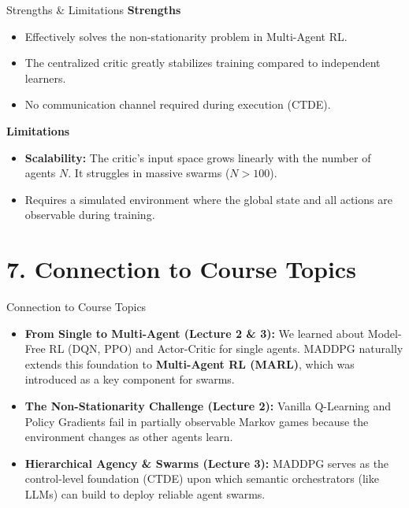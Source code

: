 \documentclass[aspectratio=169]{beamer}
\begin{document}
\begin{frame}{Strengths \& Limitations}
    \textbf{Strengths}
    \begin{itemize}
        \item Effectively solves the non-stationarity problem in Multi-Agent RL.
        \item The centralized critic greatly stabilizes training compared to independent learners.
        \item No communication channel required during execution (CTDE).
    \end{itemize}
    \vspace{0.5cm}
    \textbf{Limitations}
    \begin{itemize}
        \item \textbf{Scalability:} The critic's input space grows linearly with the number of agents $N$. It struggles in massive swarms ($N > 100$).
        \item Requires a simulated environment where the global state and all actions are observable during training.
    \end{itemize}
\end{frame}

\section{7. Connection to Course Topics}

\begin{frame}{Connection to Course Topics}
    \begin{itemize}
        \item \textbf{From Single to Multi-Agent (Lecture 2 \& 3):} We learned about Model-Free RL (DQN, PPO) and Actor-Critic for single agents. MADDPG naturally extends this foundation to \textbf{Multi-Agent RL (MARL)}, which was introduced as a key component for swarms.
        \item \textbf{The Non-Stationarity Challenge (Lecture 2):} Vanilla Q-Learning and Policy Gradients fail in partially observable Markov games because the environment changes as other agents learn.
        \item \textbf{Hierarchical Agency \& Swarms (Lecture 3):} MADDPG serves as the control-level foundation (CTDE) upon which semantic orchestrators (like LLMs) can build to deploy reliable agent swarms.
    \end{itemize}
\end{frame}
\end{document}
